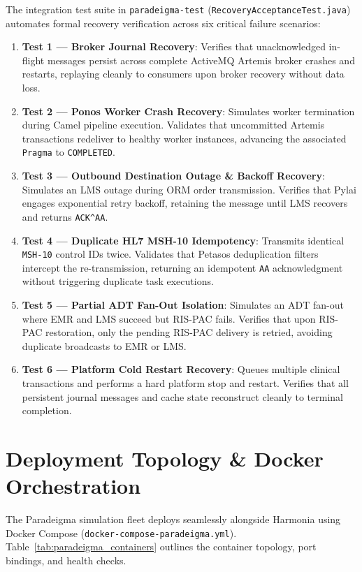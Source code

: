 The integration test suite in \texttt{paradeigma-test} (\texttt{RecoveryAcceptanceTest.java}) automates formal recovery verification across six critical failure scenarios:

\begin{enumerate}
    \item \textbf{Test 1 --- Broker Journal Recovery}: Verifies that unacknowledged in-flight messages persist across complete ActiveMQ Artemis broker crashes and restarts, replaying cleanly to consumers upon broker recovery without data loss.
    \item \textbf{Test 2 --- Ponos Worker Crash Recovery}: Simulates worker termination during Camel pipeline execution. Validates that uncommitted Artemis transactions redeliver to healthy worker instances, advancing the associated \texttt{Pragma} to \texttt{COMPLETED}.
    \item \textbf{Test 3 --- Outbound Destination Outage \& Backoff Recovery}: Simulates an LMS outage during ORM order transmission. Verifies that Pylai engages exponential retry backoff, retaining the message until LMS recovers and returns \texttt{ACK\^{}AA}.
    \item \textbf{Test 4 --- Duplicate HL7 MSH-10 Idempotency}: Transmits identical \texttt{MSH-10} control IDs twice. Validates that Petasos deduplication filters intercept the re-transmission, returning an idempotent \texttt{AA} acknowledgment without triggering duplicate task executions.
    \item \textbf{Test 5 --- Partial ADT Fan-Out Isolation}: Simulates an ADT fan-out where EMR and LMS succeed but RIS-PAC fails. Verifies that upon RIS-PAC restoration, only the pending RIS-PAC delivery is retried, avoiding duplicate broadcasts to EMR or LMS.
    \item \textbf{Test 6 --- Platform Cold Restart Recovery}: Queues multiple clinical transactions and performs a hard platform stop and restart. Verifies that all persistent journal messages and cache state reconstruct cleanly to terminal completion.
\end{enumerate}

\section{Deployment Topology \& Docker Orchestration}
\label{sec:paradeigma_deployment}

The Paradeigma simulation fleet deploys seamlessly alongside Harmonia using Docker Compose (\texttt{docker-compose-paradeigma.yml}). Table~\ref{tab:paradeigma_containers} outlines the container topology, port bindings, and health checks.

